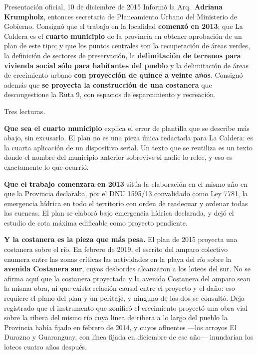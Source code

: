 \begin{ficha}{Presentación oficial, 10 de diciembre de 2015}
Informó la Arq.\ \textbf{Adriana Krumpholz}, entonces secretaria de Planeamiento Urbano del Ministerio de Gobierno. Consignó que el trabajo en la localidad \textbf{comenzó en 2013}; que La Caldera es el \textbf{cuarto municipio} de la provincia en obtener aprobación de un plan de este tipo; y que los puntos centrales son la recuperación de áreas verdes, la definición de sectores de preservación, la \textbf{delimitación de terrenos para vivienda social sólo para habitantes del pueblo} y la delimitación de áreas de crecimiento urbano \textbf{con proyección de quince a veinte años}. Consignó además que \textbf{se proyecta la construcción de una costanera} que descongestione la Ruta 9, con espacios de esparcimiento y recreación.
\end{ficha}

\begin{cautela}
Tres lecturas.

\textbf{Que sea el cuarto municipio} explica el error de plantilla que se describe más abajo, sin excusarlo. El plan no es una pieza única redactada para La Caldera: es la cuarta aplicación de un dispositivo serial. Un texto que se reutiliza es un texto donde el nombre del municipio anterior sobrevive si nadie lo relee, y eso es exactamente lo que ocurrió.

\textbf{Que el trabajo comenzara en 2013} sitúa la elaboración en el mismo año en que la Provincia declaraba, por el DNU 1595/13 convalidado como Ley 7781, la emergencia hídrica en todo el territorio con orden de readecuar y ordenar todas las cuencas. El plan se elaboró bajo emergencia hídrica declarada, y dejó el estudio de cota máxima edificable como proyecto pendiente.

\textbf{Y la costanera es la pieza que más pesa.} El plan de 2015 proyecta una costanera sobre el río. En febrero de 2019, el escrito del amparo colectivo enumera entre las zonas críticas las actividades en la playa del río sobre la \textbf{avenida Costanera sur}, cuyos desbordes alcanzaron a los loteos del sur. No se afirma aquí que la costanera proyectada y la avenida Costanera del amparo sean la misma obra, ni que exista relación causal entre el proyecto y el daño: eso requiere el plano del plan y un peritaje, y ninguno de los dos se consultó. Deja registrado que el instrumento que zonificó el crecimiento proyectó una obra vial sobre la ribera del mismo río cuya línea de ribera a lo largo del pueblo la Provincia había fijado en febrero de 2014, y cuyos afluentes ---los arroyos El Durazno y Guaranguay, con línea fijada en diciembre de ese año--- inundarían los loteos cuatro años después.
\end{cautela}

